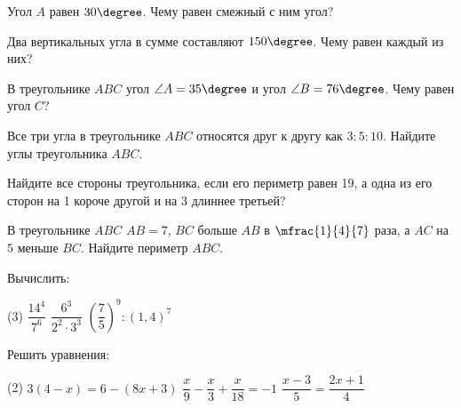 %
%
%
%		
%
%
\begin{exam}
	\begin{listofex}
		\item Угол \( A \) равен \( 30\degree \). Чему равен смежный с ним угол?
		\item Два вертикальных угла в сумме составляют \( 150\degree \). Чему равен каждый из них?
		\item В треугольнике \( ABC \) угол \( \angle  A = 35\degree \) и угол \( \angle B = 76\degree \). Чему равен угол \( C \)?
		\item Все три угла в треугольнике \( ABC \) относятся друг к другу как \( 3:5:10 \). Найдите углы треугольника \( ABC \).
		\item Найдите все стороны треугольника, если его периметр равен 19, а одна из его сторон на 1 короче другой и на 3 длиннее третьей?
		\item В треугольнике \( ABC \) \( AB = 7 \), \( BC \) больше \( AB \) в \( \mfrac{1}{4}{7} \) раза, а \( AC \) на \( 5 \) меньше \( BC \). Найдите периметр \( ABC \).
		\item Вычислить:
		\begin{tasks}(3)
			\task \( \dfrac{14^4}{7^6} \)
			\task \( \dfrac{6^3}{2^2\cdot3^3} \)
			\task \( \left( \dfrac{7}{5} \right)^9:(1,4)^7 \)
		\end{tasks}
		\item Решить уравнения:
		\begin{tasks}(2)
			\task \( 3(4-x)=6-(8x+3) \)
			\task \( \dfrac{x}{9}-\dfrac{x}{3}+\dfrac{x}{18}=-1 \)
			\task \( \dfrac{x-3}{5}=\dfrac{2x+1}{4} \)
		\end{tasks}
	\end{listofex}
\end{exam}